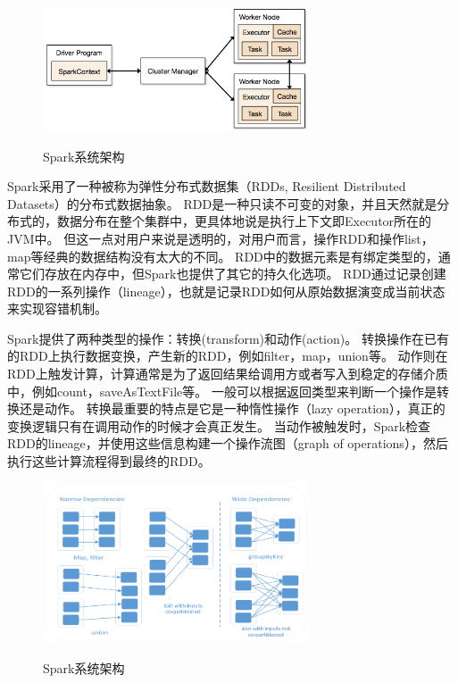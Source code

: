 \documentclass[master]{njuthesis}
\begin{document}
\begin{figure}[h]
  \centering
  \includegraphics[width= 0.7\textwidth]{figure/spark_components.png}\\
  \caption{Spark系统架构}
  \label{fig:spark_components}
\end{figure}
Spark采用了一种被称为弹性分布式数据集\cite{DBLP:conf/nsdi/ZahariaCDDMMFSS12}（RDDs, Resilient Distributed Datasets）的分布式数据抽象。
RDD是一种只读不可变的对象，并且天然就是分布式的，数据分布在整个集群中，更具体地说是执行上下文即Executor所在的JVM中。
但这一点对用户来说是透明的，对用户而言，操作RDD和操作list，map等经典的数据结构没有太大的不同。
RDD中的数据元素是有绑定类型的，通常它们存放在内存中，但Spark也提供了其它的持久化选项。
RDD通过记录创建RDD的一系列操作（lineage），也就是记录RDD如何从原始数据演变成当前状态来实现容错机制。

Spark提供了两种类型的操作：转换(transform)和动作(action)。 
转换操作在已有的RDD上执行数据变换，产生新的RDD，例如filter，map，union等。
动作则在RDD上触发计算，计算通常是为了返回结果给调用方或者写入到稳定的存储介质中，例如count，saveAsTextFile等。
一般可以根据返回类型来判断一个操作是转换还是动作。
转换最重要的特点是它是一种惰性操作（lazy operation），真正的变换逻辑只有在调用动作的时候才会真正发生。
当动作被触发时，Spark检查RDD的lineage，并使用这些信息构建一个操作流图（graph of operations），然后执行这些计算流程得到最终的RDD。

\iffalse
\begin{figure}[htbp]
  \centering
  \includegraphics[width= 0.7\textwidth]{figure/rdd_dependency.png}\\
  \caption{Spark系统架构}
  \label{fig:rdd_dependency}
\end{figure}
\end{document}
